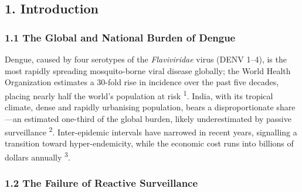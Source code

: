 \documentclass[
  10pt,
  twocolumn]{article}
\begin{document}
\begin{abstract}
month-ahead dynamics. Crucially, the ablation showed structural
covariates add little to \emph{short-term} forecasting, yet
\emph{between-state} cumulative burden tracked GDP per capita (Spearman
ρ = 0.51, p = 0.05), locating vulnerability's true role in cross-state
stratification rather than temporal prediction. The simplified Field
Scorecard reproduced model risk ordering closely (ρ = 0.76, p
\textless{} 0.001). \textbf{Conclusions:} A transparent,
leakage-controlled multi-modal framework predicts dengue intensity and
outbreak timing with strong accuracy, while an explicit ablation
honestly disentangles which signals matter and where. Seasonality and
case momentum drive short-term risk; structural vulnerability
differentiates the chronic burden borne by states with weaker systems.
The accompanying risk map and validated field tool provide a deployable
pathway toward anticipatory dengue control. \textbf{Keywords:} Dengue;
Machine Learning; Gradient Boosting; Time-series cross-validation;
India; NVBDCP; Outbreak prediction; Public-health informatics
\end{abstract}

\subsection{1. Introduction}\label{introduction}

\subsubsection{1.1 The Global and National Burden of
Dengue}\label{the-global-and-national-burden-of-dengue}

Dengue, caused by four serotypes of the \emph{Flaviviridae} virus (DENV
1--4), is the most rapidly spreading mosquito-borne viral disease
globally; the World Health Organization estimates a 30-fold rise in
incidence over the past five decades, placing nearly half the world's
population at risk \textsuperscript{1}. India, with its tropical
climate, dense and rapidly urbanising population, bears a
disproportionate share---an estimated one-third of the global burden,
likely underestimated by passive surveillance \textsuperscript{2}.
Inter-epidemic intervals have narrowed in recent years, signalling a
transition toward hyper-endemicity, while the economic cost runs into
billions of dollars annually \textsuperscript{3}.

\subsubsection{1.2 The Failure of Reactive
Surveillance}\label{the-failure-of-reactive-surveillance}
\end{document}
